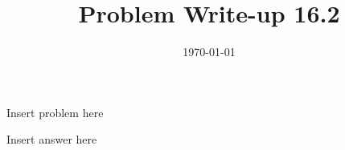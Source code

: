 \documentclass[12pt,a4paper]{article}
\title{Problem Write-up 16.2}
\date{\today}
\begin{document}
    \begin{problem}
        Insert problem here
    \end{problem}
    
    \begin{answer}
        Insert answer here
    \end{answer}
\end{document}
